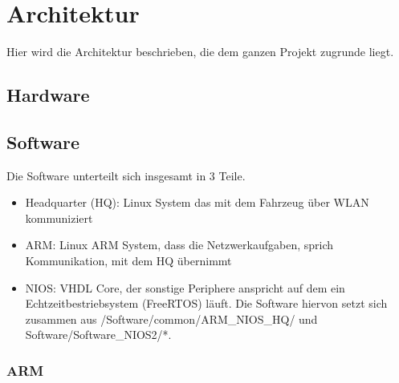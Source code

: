 \chapter{Architektur}
Hier wird die Architektur beschrieben, die dem ganzen Projekt zugrunde liegt.
\section{Hardware}

\section{Software}
Die Software unterteilt sich insgesamt in 3 Teile.
\begin{itemize}
 \item Headquarter (HQ): Linux System das mit dem Fahrzeug über WLAN kommuniziert
 \item ARM: Linux ARM System, dass die Netzwerkaufgaben, sprich Kommunikation, mit dem HQ übernimmt
 \item NIOS: VHDL Core, der sonstige Periphere anspricht auf dem ein Echtzeitbestriebsystem (FreeRTOS) läuft. Die Software hiervon setzt sich zusammen aus /Software/common/ARM\_NIOS\_HQ/ und Software/Software\_NIOS2/*.
\end{itemize}

\subsection{ARM}

